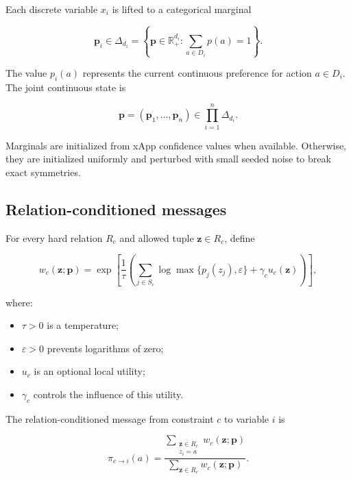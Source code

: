 \documentclass[pdflatex,sn-mathphys-num,iicol,oneside]{sn-jnl}
\begin{document}
Each discrete variable $x_i$ is lifted to a categorical marginal

\begin{equation}
\bm{p}_i
\in
\Delta_{d_i}
=
\left\{
\bm{p}\in\mathbb{R}_{+}^{d_i}:
\sum_{a\in D_i}p(a)=1
\right\}.
\end{equation}

The value $p_i(a)$ represents the current continuous preference for
action $a\in D_i$. The joint continuous state is

\begin{equation}
\bm{p}
=
(\bm{p}_1,\ldots,\bm{p}_n)
\in
\prod_{i=1}^{n}\Delta_{d_i}.
\end{equation}

Marginals are initialized from xApp confidence values when available.
Otherwise, they are initialized uniformly and perturbed with small
seeded noise to break exact symmetries.

\subsection{Relation-conditioned messages}

For every hard relation $R_c$ and allowed tuple
$\bm{z}\in R_c$, define

\begin{equation}
w_c(\bm{z};\bm{p})
=
\exp\left[
\frac{1}{\tau}
\left(
\sum_{j\in S_c}
\log\max\{p_j(z_j),\varepsilon\}
+
\gamma_c u_c(\bm{z})
\right)
\right],
\label{eq:tuple-weight}
\end{equation}

where:

\begin{itemize}
    \item $\tau>0$ is a temperature;
    \item $\varepsilon>0$ prevents logarithms of zero;
    \item $u_c$ is an optional local utility;
    \item $\gamma_c$ controls the influence of this utility.
\end{itemize}

The relation-conditioned message from constraint $c$ to variable $i$
is

\begin{equation}
\pi_{c\rightarrow i}(a)
=
\frac{
\displaystyle
\sum_{\substack{\bm{z}\in R_c\\z_i=a}}
w_c(\bm{z};\bm{p})
}{
\displaystyle
\sum_{\bm{z}\in R_c}
w_c(\bm{z};\bm{p})
}.
\label{eq:message}
\end{equation}
\end{document}
